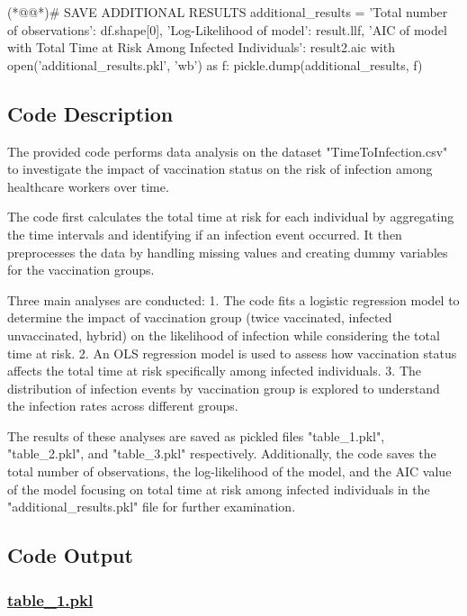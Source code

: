 \documentclass[11pt]{article}
\begin{document}
\begin{python}
(*@@*)# SAVE ADDITIONAL RESULTS
additional_results = {
    'Total number of observations': df.shape[0],
    'Log-Likelihood of model': result.llf,
    'AIC of model with Total Time at Risk Among Infected Individuals': result2.aic
}
with open('additional_results.pkl', 'wb') as f:
    pickle.dump(additional_results, f)

\end{python}

\subsection{Code Description}

The provided code performs data analysis on the dataset "TimeToInfection.csv" to investigate the impact of vaccination status on the risk of infection among healthcare workers over time. 

The code first calculates the total time at risk for each individual by aggregating the time intervals and identifying if an infection event occurred. It then preprocesses the data by handling missing values and creating dummy variables for the vaccination groups.

Three main analyses are conducted:
1. The code fits a logistic regression model to determine the impact of vaccination group (twice vaccinated, infected unvaccinated, hybrid) on the likelihood of infection while considering the total time at risk.
2. An OLS regression model is used to assess how vaccination status affects the total time at risk specifically among infected individuals.
3. The distribution of infection events by vaccination group is explored to understand the infection rates across different groups.

The results of these analyses are saved as pickled files "table\_1.pkl", "table\_2.pkl", and "table\_3.pkl" respectively. Additionally, the code saves the total number of observations, the log-likelihood of the model, and the AIC value of the model focusing on total time at risk among infected individuals in the "additional\_results.pkl" file for further examination.

\subsection{Code Output}\hypertarget{file-table-1-pkl}{}

\subsubsection*{\hyperlink{code-Data Analysis-table-1-pkl}{table\_1.pkl}}
\end{document}
